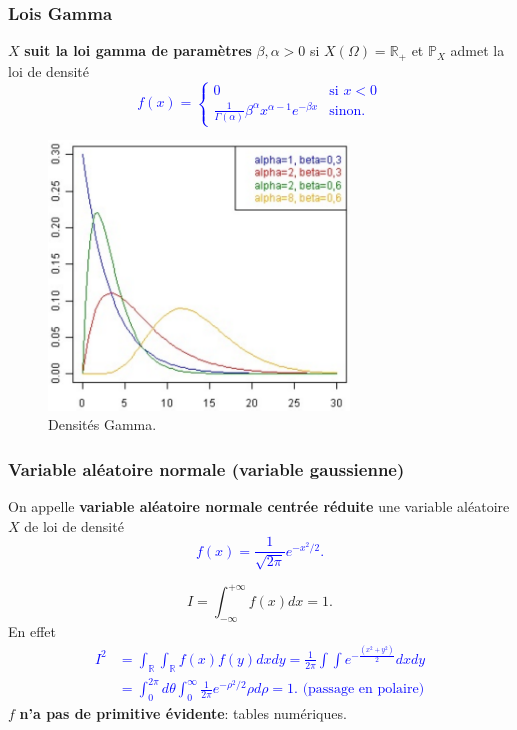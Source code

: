 \subsubsection{Lois Gamma}
\theoremstyle{definition}
\begin{definition}
$X$ \textbf{suit la loi gamma de paramètres} $\beta,\alpha>0$ si $X(\Omega)=\mathbb{R}_{+}$ et $\mathbb{P}_X$
admet la loi de densité
\textcolor{blue}{$$f(x) = \begin{cases} 0 & \mbox{si   } x<0\\ \frac{1}{\Gamma(\alpha)}\beta^{\alpha}x^{\alpha-1}e^{-\beta x} & \mbox{sinon}.\end{cases}$$}
\end{definition}

\begin{figure}[h]
\centering
\includegraphics[width=8cm]{content/gamma.PNG}
\caption{Densités Gamma.}
\end{figure}

\subsubsection{Variable aléatoire normale (variable gaussienne)}

\theoremstyle{definition}
\begin{definition}
On appelle \textbf{variable aléatoire normale centrée réduite} une variable
aléatoire $X$ de loi de densité \textcolor{blue}{$$f(x)=\frac{1}{\sqrt{2\pi}}e^{-x^2/2}.$$}
\end{definition}

\begin{remark}
$$I=\int_{-\infty}^{+\infty}f(x)dx=1.$$
En effet \textcolor{blue}{
\begin{align*}
I^2 &=\int_{\mathbb{R}}\int_{\mathbb{R}}f(x)f(y)dxdy=\frac{1}{2\pi}\int\int e^{-\frac{(x^2+y^2)}{2}}dxdy\\
    &=\int_{0}^{2\pi}d\theta\int_{0}^{\infty}\frac{1}{2\pi}e^{-\rho^2/2}\rho d\rho=1.\text{ (passage en polaire)}
\end{align*}
}
$f$ \textbf{n’a pas de primitive évidente}: tables numériques.
\end{remark}

